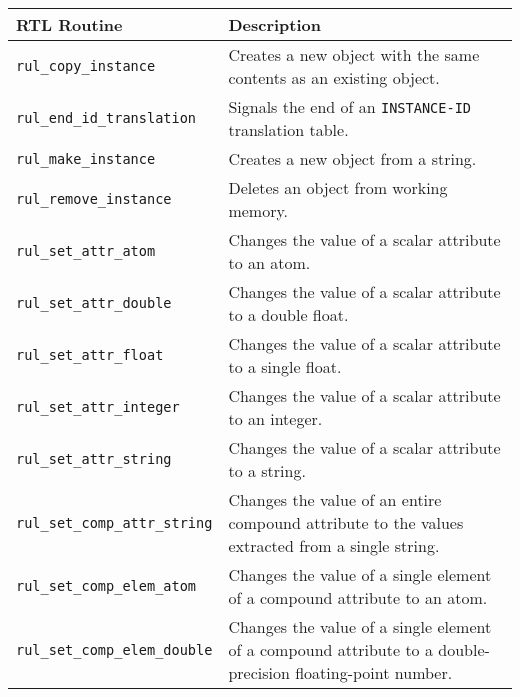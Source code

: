 \begin{table}[h]
  \begin{tabularx}{\columnwidth}{lX}
    \toprule
    RTL Routine & Description \\
    \midrule
    \verb|rul_copy_instance| & Creates a new object with the same contents   
                               as an existing object.                        \\
    \verb|rul_end_id_translation| & Signals the end of an \verb|INSTANCE-ID|
                                    translation table. \\
    \verb|rul_make_instance| & Creates a new object from a string.           \\
    \verb|rul_remove_instance| & Deletes an object from working memory.        \\
    \verb|rul_set_attr_atom| & Changes the value of a scalar attribute to an 
                               atom.                                         \\
    \verb|rul_set_attr_double| & Changes the value of a scalar attribute to a  
                                 double float.                                 \\
    \verb|rul_set_attr_float| & Changes the value of a scalar attribute to a  
                                single float.                                 \\
    \verb|rul_set_attr_integer| & Changes the value of a scalar attribute to an 
                                  integer.                                      \\
    \verb|rul_set_attr_string| & Changes the value of a scalar attribute to a  
                                 string.                                       \\
    \verb|rul_set_comp_attr_string| & Changes the value of an entire compound       
                                      attribute to the values extracted from a      
                                      single string.                                \\
    \verb|rul_set_comp_elem_atom| & Changes the value of a single element of a    
                                    compound attribute to an atom.                \\
    \verb|rul_set_comp_elem_double| & Changes the value of a single element of a    
                                      compound attribute to a double-precision      
                                      floating-point number.                        \\

\end{tabularx}
\end{table}
